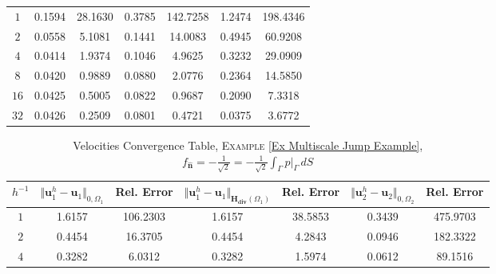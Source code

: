 \documentclass[3p]{elsarticle}
\def\uone{\mathbf{u}_{1}}
\def\utwo{\mathbf{u}_{2}}
\def\Hdiv{\mathbf{H_{div}}}
\def\flux{f_{\bm{\hat{n}} } }
\begin{document}
\begin{example}
\begin{table}[h!]
\begin{center}
\begin{tabular}{ c c c c c c c }
\\ %
    \toprule
$ 1 $ &   0.1594  &  28.1630 &  0.3785  & 142.7258  &   1.2474 & 198.4346  \\
$ 2 $  &  0.0558  &  5.1081  &  0.1441  & 14.0083   & 0.4945  &  60.9208   \\
$ 4 $ &   0.0414  &  1.9374 &  0.1046  & 4.9625    &  0.3232  &   29.0909   \\
$ 8 $  &  0.0420  &    0.9889 &  0.0880  & 2.0776   &  0.2364  &  14.5850    \\ 
%
$ 16 $  &  0.0425  &   0.5005 &  0.0822  & 0.9687    &  0.2090  &  7.3318  \\ 
%
$ 32 $  &  0.0426  &     0.2509  &  0.0801  & 0.4721   &  0.0375   &   3.6772  \\ 
%
    \hline
\end{tabular}
\end{center}
%
\end{table}
%
%
\begin{table*}[h!]
\caption{Velocities Convergence Table, \textsc{Example} \ref{Ex Multiscale Jump Example}, $ \flux = - \frac{1}{\sqrt{2} } =  - \frac{1}{\sqrt{2} } \int_{\Gamma} p\big\vert_{\Gamma} \, dS $}\label{Table Mult Jump Error Velocity Approximation}
\def\arraystretch{1.4}
\begin{center}
\begin{tabular}{ c c c c c c c }
    \hline
    \rowcolor{gray!50}
$ h^{-1} $  
& $ \Vert  \uone^{h}- \uone  \Vert_{ 0, \Omega_{1} } $ 
& Rel. Error %
& $ \Vert  \uone^{h}- \uone  \Vert_{\Hdiv(\Omega_{1})} $ 
& Rel. Error %
& $ \Vert  \utwo^{h}- \utwo  \Vert_{ 0, \Omega_{2} } $ 
& Rel. Error %
\\ %
    \toprule
$ 1 $ &   1.6157 &  106.2303  &   1.6157 & 38.5853  &   0.3439  & 475.9703 \\
$ 2 $  &   0.4454  &  16.3705   &  0.4454  &  4.2843   &  0.0946   &  182.3322 \\
$ 4 $ &   0.3282  &  6.0312  &  0.3282  &   1.5974  &  0.0612   &  89.1516  \\

\end{tabular}
\end{center}
\end{table*}
\end{example}
\end{document}
